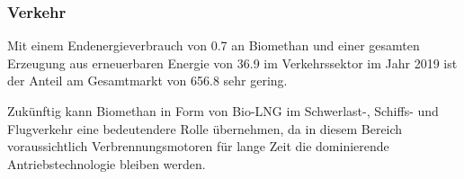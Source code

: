 \subsubsection{Verkehr}

Mit einem Endenergieverbrauch von \SI{0.7}{\twh} an Biomethan und einer gesamten Erzeugung aus erneuerbaren Energie von \SI{36.9}{\twh} im Verkehrssektor im Jahr 2019 ist der Anteil am Gesamtmarkt von \SI{656.8}{\twh} sehr gering. \parencite{BWE2020} \smallskip

Zukünftig kann Biomethan in Form von Bio-\gls{LNG} im Schwerlast-, Schiffs- und Flugverkehr eine bedeutendere Rolle übernehmen, da in diesem Bereich voraussichtlich Verbrennungsmotoren für lange Zeit die dominierende Antriebstechnologie bleiben werden. \parencite{dena2017}